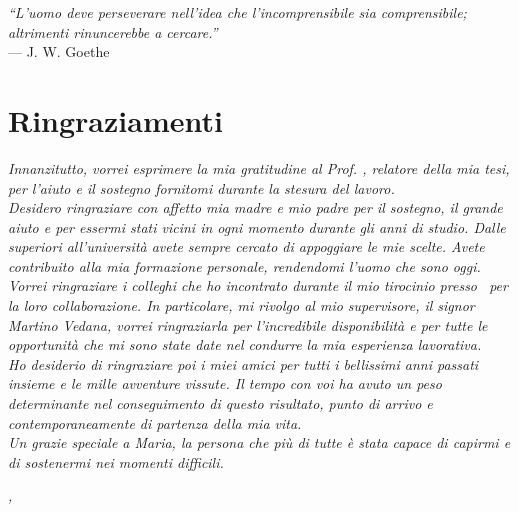
\cleardoublepage
{}
{}

\begin{flushright}{
	\slshape    
	``L’uomo deve perseverare nell'idea che l'incomprensibile sia comprensibile; altrimenti rinuncerebbe a cercare.''} \\ 
	\medskip
    --- J. W. Goethe
\end{flushright}


\bigskip

\begingroup
\let\clearpage\relax
\let\cleardoublepage\relax
\let\cleardoublepage\relax

\chapter*{Ringraziamenti}

\noindent \textit{Innanzitutto, vorrei esprimere la mia gratitudine al Prof. \myProf, relatore della mia tesi, per l'aiuto e il sostegno fornitomi durante la stesura del lavoro.}\\

\noindent \textit{Desidero ringraziare con affetto mia madre e mio padre per il sostegno, il grande aiuto e per essermi stati vicini in ogni momento durante gli anni di studio. Dalle superiori all'università avete sempre cercato di appoggiare le mie scelte. Avete contribuito alla mia formazione personale, rendendomi l'uomo che sono oggi.}\\

\noindent \textit{Vorrei ringraziare i colleghi che ho incontrato durante il mio tirocinio presso \azienda\ per la loro collaborazione. In particolare, mi rivolgo al mio supervisore, il signor Martino Vedana, vorrei ringraziarla per l'incredibile disponibilità e per tutte le opportunità che mi sono state date nel condurre la mia esperienza lavorativa.}\\

\noindent \textit{Ho desiderio di ringraziare poi i miei amici per tutti i bellissimi anni passati insieme e le mille avventure vissute. Il tempo con voi ha avuto un peso determinante nel conseguimento di questo risultato, punto di arrivo e contemporaneamente di partenza della mia vita.}\\

\noindent \textit{Un grazie speciale a Maria, la persona che più di tutte è stata capace di capirmi e di sostenermi nei momenti difficili.}\\

\bigskip

\noindent\textit{\myLocation, \myTime}
\hfill \myName

\endgroup

